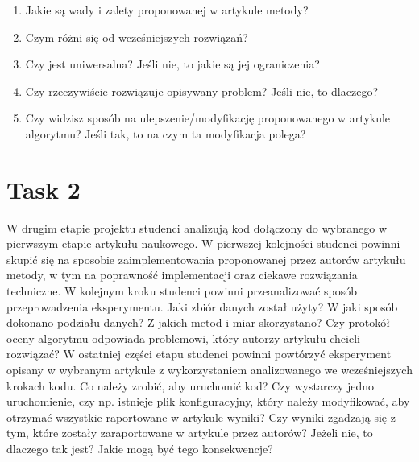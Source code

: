 \documentclass{article}
\begin{document}
\begin{enumerate}
    \begin{enumerate}
        \item Jakie są wady i zalety proponowanej w artykule metody?
        \item Czym różni się od wcześniejszych rozwiązań?
        \item Czy jest uniwersalna? Jeśli nie, to jakie są jej ograniczenia?
        \item Czy rzeczywiście rozwiązuje opisywany problem? Jeśli nie, to dlaczego?
        \item Czy widzisz sposób na ulepszenie/modyfikację proponowanego w artykule algorytmu? Jeśli tak, to na czym ta modyfikacja polega?
    \end{enumerate}
\end{enumerate}

\section{Task 2}
W drugim etapie projektu studenci analizują kod dołączony do wybranego
w pierwszym etapie artykułu naukowego. W pierwszej kolejności studenci
powinni skupić się na sposobie zaimplementowania proponowanej przez
autorów artykułu metody, w tym na poprawność implementacji oraz ciekawe
rozwiązania techniczne.
W kolejnym kroku studenci powinni przeanalizować sposób
przeprowadzenia eksperymentu. Jaki zbiór danych został użyty? W jaki sposób
dokonano podziału danych? Z jakich metod i miar skorzystano? Czy protokół
oceny algorytmu odpowiada problemowi, który autorzy artykułu chcieli
rozwiązać?
W ostatniej części etapu studenci powinni powtórzyć eksperyment opisany
w wybranym artykule z wykorzystaniem analizowanego we wcześniejszych
krokach kodu. Co należy zrobić, aby uruchomić kod? Czy wystarczy jedno
uruchomienie, czy np. istnieje plik konfiguracyjny, który należy modyfikować,
aby otrzymać wszystkie raportowane w artykule wyniki? Czy wyniki zgadzają się
z tym, które zostały zaraportowane w artykule przez autorów? Jeżeli nie, to
dlaczego tak jest? Jakie mogą być tego konsekwencje?
\end{document}
